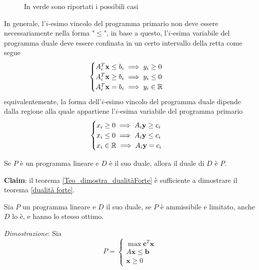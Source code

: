 \documentclass[10pt, letterpaper]{report}
\begin{document}
\begin{figure}[h]
    \caption{In verde sono riportati i possibili casi}
\end{figure}

In generale, l'$i$-esimo vincolo del programma primario non deve essere necessariamente nella forma "$\le$", in base a questo, l'$i$-esima variabile del programma duale deve essere confinata in un certo intervallo della retta come segue$$
\begin{cases}
    A_i^T\mathbf x\le b_i \implies y_i \ge 0\\
    A_i^T\mathbf x\ge b_i \implies y_i \le 0\\
    A_i^T\mathbf x= b_i \implies y_i \in {\mathbb R}
\end{cases}$$
equivalentemente, la forma dell'$i$-esimo vincolo del programma duale dipende dalla regione alla quale appartiene l'$i$-esima variabile del programma primario 
$$\begin{cases}
    x_i \ge 0 \implies A_i\mathbf y \ge c_i\\ 
    x_i \le 0 \implies A_i\mathbf y \le c_i\\ 
    x_i \in {\mathbb R}\implies A_i\mathbf y = c_i
\end{cases}$$
\begin{proposizione}
    Se $P$ è un programma lineare e $D$ è il suo duale, allora il duale di $D$ è $P$.
\end{proposizione}
\textbf{Claim}: il teorema \ref{Teo_dimostra_dualitàForte} è sufficiente a dimostrare il teorema \ref{dualità forte}.  
\begin{teorema}\label{Teo_dimostra_dualitàForte}
    Sia $P$ un programma lineare e $D$ il suo duale, se $P$ è ammissibile e limitato, anche $D$ lo è, e hanno lo stesso ottimo.
\end{teorema}
\textit{Dimostrazione}: Sia 
$$ P=\begin{cases}
    \max \mathbf c^T\mathbf x\\ 
        A\mathbf x \le \mathbf b \\ 
        \mathbf x \ge 0 
\end{cases}$$
\end{document}
